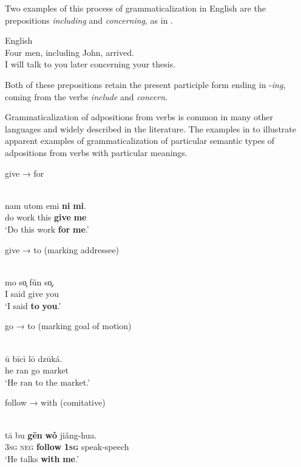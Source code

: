 \documentclass[output=paper]{langsci/langscibook}
\begin{document}
Two examples of this process of grammaticalization in English are the prepositions \textit{including} and \textit{concerning}, as in .

\ea
{English}\\
\ea  Four men, including John, arrived.\\
\ex  I will talk to you later concerning your thesis.\\
\z
\z

Both of these prepositions retain the present participle form ending in -\textit{ing}, coming from the verbs \textit{include} and \textit{concern}. 

Grammaticalization of adpositions from verbs is common in many other languages and widely described in the literature. The examples in  to  illustrate apparent examples of grammaticalization of particular semantic types of adpositions from verbs with particular meanings.

give → for

\ea\label{ex:dryer:}
\\
\gll   nam  utom  emi  \textbf{ni}  \textbf{mi}.\\
       do  work  this  \textbf{give}  \textbf{me}\\
\glt   ‘Do this work \textbf{for} \textbf{me}.’
\z

give → to (marking addressee)

\ea\label{ex:dryer:}
\\
\gll   mo  so̧  fún  so̧.\\
       I  said  give  you\\
\glt   ‘I said \textbf{to} \textbf{you}.’
\z

go → to (marking goal of motion)

\ea\label{ex:dryer:}
\\
\gll   ū  bīcī  lō  dzūká.\\
       he  ran  go  market\\
\glt   ‘He ran to the market.’
\z

follow → with (comitative)

\ea\label{ex:dryer:}
\\
\gll   tā  bu  \textbf{gēn}  \textbf{wǒ}  jiǎng-hua.\\
       3\textsc{sg}  \textsc{neg}  \textbf{follow}  \textbf{\textsc{1sg}}  speak-speech\\
\glt   ‘He talks \textbf{with} \textbf{me}.’
\z
\end{document}
